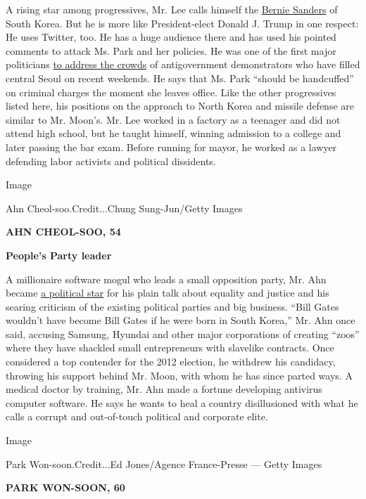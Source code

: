 A rising star among progressives, Mr. Lee calls himself the
\href{http://www.nytimes3xbfgragh.onion/topic/person/bernard-sanders}{Bernie
Sanders} of South Korea. But he is more like President-elect Donald J.
Trump in one respect: He uses Twitter, too. He has a huge audience there
and has used his pointed comments to attack Ms. Park and her policies.
He was one of the first major politicians
\href{http://www.nytimes3xbfgragh.onion/2016/10/31/world/asia/south-korea-choi-soon-sil.html}{to
address the crowds} of antigovernment demonstrators who have filled
central Seoul on recent weekends. He says that Ms. Park ``should be
handcuffed'' on criminal charges the moment she leaves office. Like the
other progressives listed here, his positions on the approach to North
Korea and missile defense are similar to Mr. Moon's. Mr. Lee worked in a
factory as a teenager and did not attend high school, but he taught
himself, winning admission to a college and later passing the bar exam.
Before running for mayor, he worked as a lawyer defending labor
activists and political dissidents.

Image

Ahn Cheol-soo.Credit...Chung Sung-Jun/Getty Images

\textbf{AHN CHEOL-SOO, 54}

\textbf{People's Party leader}

A millionaire software mogul who leads a small opposition party, Mr. Ahn
became
\href{http://www.nytimes3xbfgragh.onion/2011/11/20/world/asia/a-new-voice-grips-south-korea-with-plain-talk-about-inequality-and-justice.html}{a
political star} for his plain talk about equality and justice and his
searing criticism of the existing political parties and big business.
``Bill Gates wouldn't have become Bill Gates if he were born in South
Korea,'' Mr. Ahn once said, accusing Samsung, Hyundai and other major
corporations of creating ``zoos'' where they have shackled small
entrepreneurs with slavelike contracts. Once considered a top contender
for the 2012 election, he withdrew his candidacy, throwing his support
behind Mr. Moon, with whom he has since parted ways. A medical doctor by
training, Mr. Ahn made a fortune developing antivirus computer software.
He says he wants to heal a country disillusioned with what he calls a
corrupt and out-of-touch political and corporate elite.

Image

Park Won-soon.Credit...Ed Jones/Agence France-Presse --- Getty Images

\textbf{PARK WON-SOON, 60}

